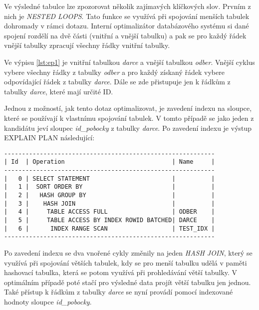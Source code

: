 \documentclass[10pt,a4paper]{article}
\begin{document}
    Ve výsledné tabulce lze zpozorovat několik zajímavých klíčkových slov.
    Prvním z nich je \textit{NESTED LOOPS}. Tato funkce se využívá při
    spojování menších tabulek dohromady v rámci dotazu. Interní optimalizátor
    databázového systému si dané spojení rozdělí na dvě části (vnitřní a vnější
    tabulku) a pak se  pro každý řádek vnější tabulky zpracují všechny řádky
    vnitřní tabulky.

    Ve výpisu \ref{lst:ep1} je vnitřní tabulkou \textit{darce} a vnější
    tabulkou \textit{odber}. Vnější cyklus vybere všechny řádky z
    tabulky \textit{odber} a pro každý získaný řádek vybere odpovídající
    řádek z tabulky \textit{darce}. Dále se zde přistupuje jen k řádkům
    z tabulky \textit{darce}, které mají určité ID.\newline

    Jednou z možností, jak tento dotaz optimalizovat, je zavedení indexu na
    sloupce, které se používají k vlastnímu spojování tabulek. V tomto případě
    se jako jeden z kandidátu jeví sloupec \textit{id\_pobocky} z tabulky
    \textit{darce}. Po zavedení indexu je výstup EXPLAIN PLAN následující:

    \begin{lstlisting}[caption=EXPLAIN PLAN se zavedeným indexem,
                       label={lst:ep2},xleftmargin=0.19\textwidth]
-----------------------------------------------------------
| Id  | Operation                              | Name     |
-----------------------------------------------------------
|   0 | SELECT STATEMENT                       |          |
|   1 |  SORT ORDER BY                         |          |
|   2 |   HASH GROUP BY                        |          |
|   3 |    HASH JOIN                           |          |
|   4 |     TABLE ACCESS FULL                  | ODBER    |
|   5 |     TABLE ACCESS BY INDEX ROWID BATCHED| DARCE    |
|   6 |      INDEX RANGE SCAN                  | TEST_IDX |
-----------------------------------------------------------
    \end{lstlisting}

    Po zavedení indexu se dva vnořené cykly změnily na jeden
    \textit{HASH JOIN}, který se využívá při spojování větších tabulek, kdy
    se pro menší tabulku udělá v paměti hashovací tabulka, která se potom
    využívá při prohledávání větší tabulky. V optimálním případě poté stačí
    pro výsledné data projít větší tabulku jen jednou. Také přístup k řádkům
    z tabulky \textit{darce} se nyní provádí pomocí indexované hodnoty sloupce
    \textit{id\_pobocky}.

    
\end{document}
